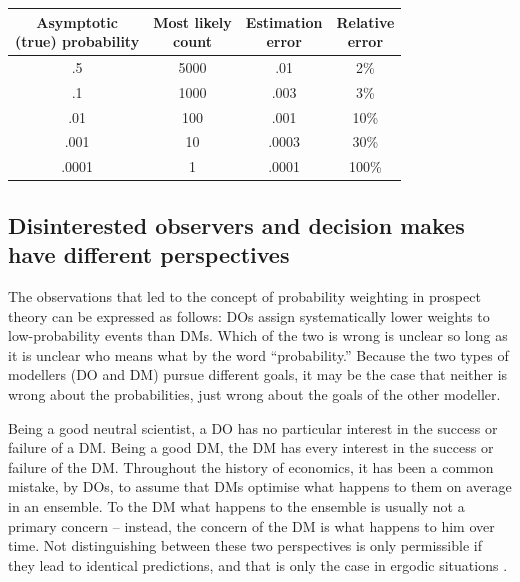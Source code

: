 \documentclass[11pt]{article}
\newcommand{\ra}[1]{\renewcommand{\arraystretch}{#1}}
\newcommand{\seclabel}[1]{\label{sec:#1}}
\newcommand{\tlabel}[1]{\label{tab:#1}}
\numberwithin{equation}{section}
\begin{document}
\begin{table}[!htb]
\ra{1.25}
\centering
{}\tlabel{errors}
\begin{tabular}{@{}cccc@{}}\toprule[2pt]
\makecell{Asymptotic\\(true) probability} & \makecell{Most likely\\count} & \makecell{Estimation\\error} & \makecell{Relative\\error}\\
\midrule[2pt]
.5 & 5000 & .01 & 2\%\\
.1 & 1000& .003 & 3\%\\
.01 & 100& .001 & 10\%\\
.001 & 10& .0003& 30\%\\
.0001 & 1& .0001 &100\%\\
\bottomrule[2pt]
\end{tabular}
\end{table}

\subsection{Disinterested observers and decision makes have different perspectives \seclabel{condition2}}
The observations that led to the concept of probability weighting in prospect theory can be expressed as follows: DOs assign systematically lower weights to low-probability events than DMs.
Which of the two is wrong is unclear so long as it is unclear who means what by the word ``probability.'' Because the two types of modellers (DO and DM) pursue different goals, it may be the case that neither is wrong about the probabilities, just wrong about the goals of the other modeller.

Being a good neutral scientist, a DO has no particular interest in the success or failure of a DM. Being a good DM, the DM has every interest in the success or failure of the DM. Throughout the history of economics, it has been a common mistake, by DOs, to assume that DMs optimise what happens to them on average in an ensemble. To the DM what happens to the ensemble is usually not a primary concern -- instead, the concern of the DM is what happens to him over time. Not distinguishing between these two perspectives is only permissible if they lead to identical predictions, and that is only the case in ergodic situations \citep{Peters2019b}. 
\end{document}
